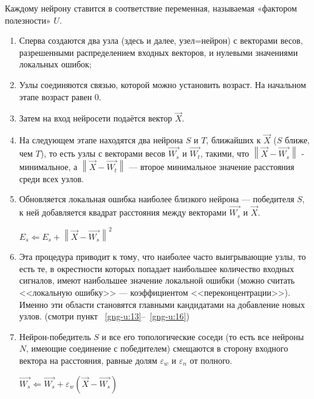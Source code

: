 \documentclass[unicode, 12pt, a4paper,oneside,fleqn]{article}
\begin{document}
Каждому нейрону ставится в соответствие переменная, называемая
«фактором полезности» $U$.
\begin{enumerate}
\item \label{gng-u:1} \label{gng:1}
  Сперва создаются два узла (здесь и далее, узел=нейрон) с
  векторами весов, разрешенными распределением входных векторов, и
  нулевыми значениями локальных ошибок;

\item \label{gng-u:2} \label{gng:2}
  Узлы соединяются связью, которой можно установить возраст. На
  начальном этапе возраст равен 0.

\item \label{gng-u:3} \label{gng:3}
  Затем на вход нейросети подаётся вектор $\vec{X}$.

\item \label{gng-u:4} \label{gng:4}
  На следующем этапе находятся два нейрона $S$ и $T$, ближайших к
  $\vec{X}$ ($S$ ближе, чем $T$), то есть узлы с векторами весов
  $\vec{W_s}$ и $\vec{W_t}$, такими, что
  $\left\|\vec{X}-\vec{W_s}\right\|$ - минимальное, а
  $\left\|\vec{X}-\vec{W_t}\right\|$ — второе минимальное значение
  расстояния среди всех узлов.

\item \label{gng-u:5} \label{gng:5}
  Обновляется локальная ошибка наиболее близкого нейрона —
  победителя $S$, к ней добавляется квадрат расстояния между векторами
  $\vec{W_s}$ и $\vec{X}$.
  
  $E_{s} \Leftarrow E_{s} + \left\|\vec{X}-\vec{W_s}\right\|^{2}$

\item \label{gng-u:6} \label{gng:6}
  Эта процедура приводит к тому, что наиболее часто выигрывающие узлы,
  то есть те, в окрестности которых попадает наибольшее количество
  входных сигналов, имеют наибольшее значение локальной ошибки (можно
  считать <<локальную ошибку>> --- коэффициентом
  <<переконцентрации>>). Именно эти области становятся главными
  кандидатами на добавление новых узлов. (смотри пункт
  ~\ref{gng-u:13}--~\ref{gng-u:16})

\item \label{gng-u:7} \label{gng:7}
  Нейрон-победитель $S$ и все его топологические соседи (то есть
  все нейроны $N$, имеющие соединение с победителем) смещаются в
  сторону входного вектора на расстояния, равные долям
  $\varepsilon _w$ и $\varepsilon _n$ от полного.

  $\vec{W_s} \Leftarrow \vec{W_s}+\varepsilon_w(\vec{X}-\vec{W_s})$


\end{enumerate}
\end{document}

